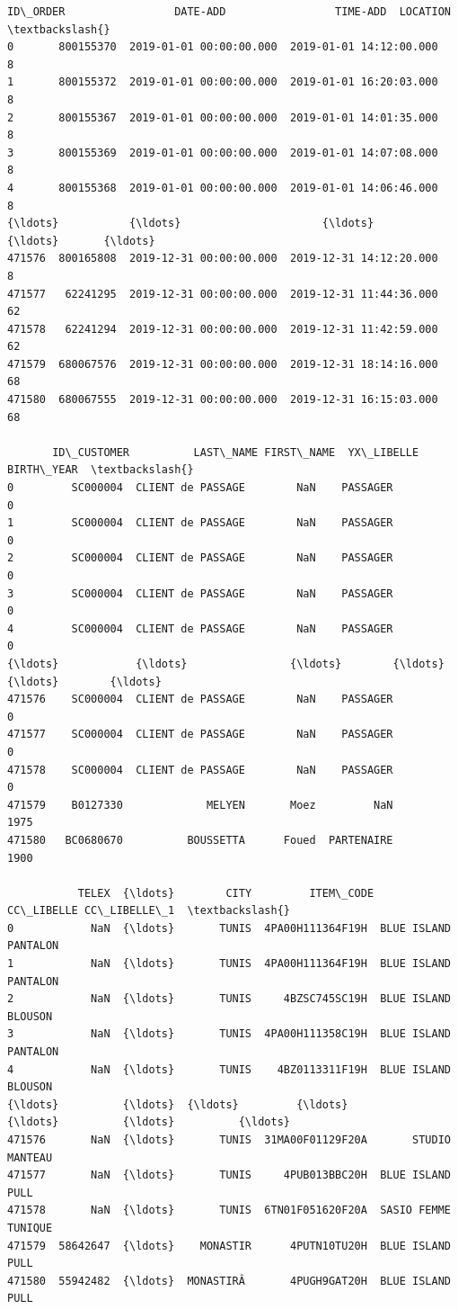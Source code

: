 \documentclass[11pt]{article}
\makeatletter
\newcommand{\boxspacing}{\kern\kvtcb@left@rule\kern\kvtcb@boxsep}
\newcommand{\prompt}[4]{
        \ttfamily\llap{{\color{#2}[#3]:\hspace{3pt}#4}}\vspace{-\baselineskip}
    }
\makeatother
\begin{document}
            \begin{tcolorbox}[breakable, size=fbox, boxrule=.5pt, pad at break*=1mm, opacityfill=0]
\prompt{Out}{outcolor}{8}{\boxspacing}
\begin{Verbatim}[commandchars=\\\{\}]
         ID\_ORDER                 DATE-ADD                 TIME-ADD  LOCATION  \textbackslash{}
0       800155370  2019-01-01 00:00:00.000  2019-01-01 14:12:00.000         8
1       800155372  2019-01-01 00:00:00.000  2019-01-01 16:20:03.000         8
2       800155367  2019-01-01 00:00:00.000  2019-01-01 14:01:35.000         8
3       800155369  2019-01-01 00:00:00.000  2019-01-01 14:07:08.000         8
4       800155368  2019-01-01 00:00:00.000  2019-01-01 14:06:46.000         8
{\ldots}           {\ldots}                      {\ldots}                      {\ldots}       {\ldots}
471576  800165808  2019-12-31 00:00:00.000  2019-12-31 14:12:20.000         8
471577   62241295  2019-12-31 00:00:00.000  2019-12-31 11:44:36.000        62
471578   62241294  2019-12-31 00:00:00.000  2019-12-31 11:42:59.000        62
471579  680067576  2019-12-31 00:00:00.000  2019-12-31 18:14:16.000        68
471580  680067555  2019-12-31 00:00:00.000  2019-12-31 16:15:03.000        68

       ID\_CUSTOMER          LAST\_NAME FIRST\_NAME  YX\_LIBELLE BIRTH\_YEAR  \textbackslash{}
0         SC000004  CLIENT de PASSAGE        NaN    PASSAGER          0
1         SC000004  CLIENT de PASSAGE        NaN    PASSAGER          0
2         SC000004  CLIENT de PASSAGE        NaN    PASSAGER          0
3         SC000004  CLIENT de PASSAGE        NaN    PASSAGER          0
4         SC000004  CLIENT de PASSAGE        NaN    PASSAGER          0
{\ldots}            {\ldots}                {\ldots}        {\ldots}         {\ldots}        {\ldots}
471576    SC000004  CLIENT de PASSAGE        NaN    PASSAGER          0
471577    SC000004  CLIENT de PASSAGE        NaN    PASSAGER          0
471578    SC000004  CLIENT de PASSAGE        NaN    PASSAGER          0
471579    B0127330             MELYEN       Moez         NaN       1975
471580   BC0680670          BOUSSETTA      Foued  PARTENAIRE       1900

           TELEX  {\ldots}        CITY         ITEM\_CODE   CC\_LIBELLE CC\_LIBELLE\_1  \textbackslash{}
0            NaN  {\ldots}       TUNIS  4PA00H111364F19H  BLUE ISLAND     PANTALON
1            NaN  {\ldots}       TUNIS  4PA00H111364F19H  BLUE ISLAND     PANTALON
2            NaN  {\ldots}       TUNIS     4BZSC745SC19H  BLUE ISLAND      BLOUSON
3            NaN  {\ldots}       TUNIS  4PA00H111358C19H  BLUE ISLAND     PANTALON
4            NaN  {\ldots}       TUNIS    4BZ0113311F19H  BLUE ISLAND      BLOUSON
{\ldots}          {\ldots}  {\ldots}         {\ldots}               {\ldots}          {\ldots}          {\ldots}
471576       NaN  {\ldots}       TUNIS  31MA00F01129F20A       STUDIO      MANTEAU
471577       NaN  {\ldots}       TUNIS     4PUB013BBC20H  BLUE ISLAND         PULL
471578       NaN  {\ldots}       TUNIS  6TN01F051620F20A  SASIO FEMME      TUNIQUE
471579  58642647  {\ldots}    MONASTIR      4PUTN10TU20H  BLUE ISLAND         PULL
471580  55942482  {\ldots}  MONASTIRÂ       4PUGH9GAT20H  BLUE ISLAND         PULL


\end{Verbatim}
\end{tcolorbox}
\end{document}
